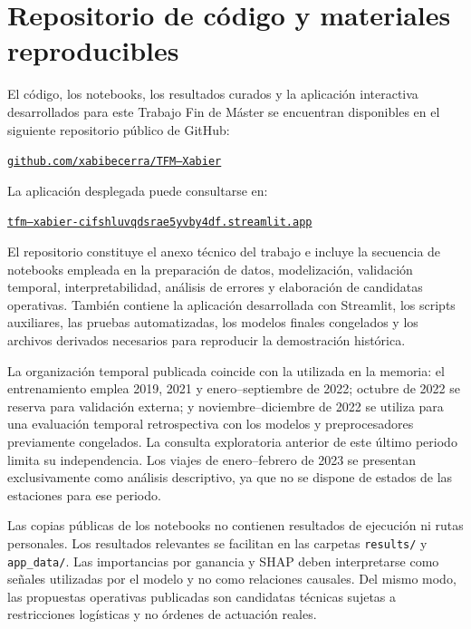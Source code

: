 
\chapter{Repositorio de código y materiales reproducibles}
\label{anexo:repositorio-github}

El código, los notebooks, los resultados curados y la aplicación interactiva
desarrollados para este Trabajo Fin de Máster se encuentran disponibles en el
siguiente repositorio público de GitHub:

\begin{center}
    \href{https://github.com/xabibecerra/TFM---Xabier}%
    {\texttt{github.com/xabibecerra/TFM---Xabier}}
\end{center}

La aplicación desplegada puede consultarse en:

\begin{center}
    \href{https://tfm---xabier-cifshluvqdsrae5yvby4df.streamlit.app/}%
    {\texttt{tfm---xabier-cifshluvqdsrae5yvby4df.streamlit.app}}
\end{center}

El repositorio constituye el anexo técnico del trabajo e incluye la secuencia
de notebooks empleada en la preparación de datos, modelización, validación
temporal, interpretabilidad, análisis de errores y elaboración de candidatas
operativas. También contiene la aplicación desarrollada con Streamlit, los
scripts auxiliares, las pruebas automatizadas, los modelos finales congelados y
los archivos derivados necesarios para reproducir la demostración histórica.

La organización temporal publicada coincide con la utilizada en la memoria:
el entrenamiento emplea 2019, 2021 y enero--septiembre de 2022; octubre de 2022
se reserva para validación externa; y noviembre--diciembre de 2022 se utiliza
para una evaluación temporal retrospectiva con los modelos y preprocesadores
previamente congelados. La consulta exploratoria anterior de este último periodo
limita su independencia. Los viajes de enero--febrero de 2023 se presentan
exclusivamente como análisis descriptivo, ya que no se dispone de estados de
las estaciones para ese periodo.

Las copias públicas de los notebooks no contienen resultados de ejecución ni
rutas personales. Los resultados relevantes se facilitan en las carpetas
\texttt{results/} y \texttt{app\_data/}. Las importancias por ganancia y SHAP
deben interpretarse como señales utilizadas por el modelo y no como relaciones
causales. Del mismo modo, las propuestas operativas publicadas son candidatas
técnicas sujetas a restricciones logísticas y no órdenes de actuación reales.

